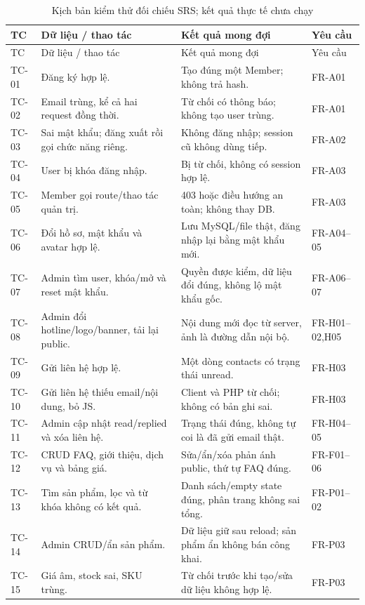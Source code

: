 {\small
\begin{longtable}{@{}P{1.3cm}P{4.7cm}P{6.1cm}P{2.4cm}@{}}
\caption{Kịch bản kiểm thử đối chiếu SRS; kết quả thực tế chưa chạy}\label{tab:test-cases}\\
\toprule TC & Dữ liệu / thao tác & Kết quả mong đợi & Yêu cầu\\\midrule\endfirsthead
\toprule TC & Dữ liệu / thao tác & Kết quả mong đợi & Yêu cầu\\\midrule\endhead
TC-01 & Đăng ký hợp lệ. & Tạo đúng một Member; không trả hash. & FR-A01\\
TC-02 & Email trùng, kể cả hai request đồng thời. & Từ chối có thông báo; không tạo user trùng. & FR-A01\\
TC-03 & Sai mật khẩu; đăng xuất rồi gọi chức năng riêng. & Không đăng nhập; session cũ không dùng tiếp. & FR-A02\\
TC-04 & User bị khóa đăng nhập. & Bị từ chối, không có session hợp lệ. & FR-A03\\
TC-05 & Member gọi route/thao tác quản trị. & 403 hoặc điều hướng an toàn; không thay DB. & FR-A03\\
TC-06 & Đổi hồ sơ, mật khẩu và avatar hợp lệ. & Lưu MySQL/file thật, đăng nhập lại bằng mật khẩu mới. & FR-A04–05\\
TC-07 & Admin tìm user, khóa/mở và reset mật khẩu. & Quyền được kiểm, dữ liệu đổi đúng, không lộ mật khẩu gốc. & FR-A06–07\\
TC-08 & Admin đổi hotline/logo/banner, tải lại public. & Nội dung mới đọc từ server, ảnh là đường dẫn nội bộ. & FR-H01–02,H05\\
TC-09 & Gửi liên hệ hợp lệ. & Một dòng contacts có trạng thái unread. & FR-H03\\
TC-10 & Gửi liên hệ thiếu email/nội dung, bỏ JS. & Client và PHP từ chối; không có bản ghi sai. & FR-H03\\
TC-11 & Admin cập nhật read/replied và xóa liên hệ. & Trạng thái đúng, không tự coi là đã gửi email thật. & FR-H04–05\\
TC-12 & CRUD FAQ, giới thiệu, dịch vụ và bảng giá. & Sửa/ẩn/xóa phản ánh public, thứ tự FAQ đúng. & FR-F01–06\\
TC-13 & Tìm sản phẩm, lọc và từ khóa không có kết quả. & Danh sách/empty state đúng, phân trang không sai tổng. & FR-P01–02\\
TC-14 & Admin CRUD/ẩn sản phẩm. & Dữ liệu giữ sau reload; sản phẩm ẩn không bán công khai. & FR-P03\\
TC-15 & Giá âm, stock sai, SKU trùng. & Từ chối trước khi tạo/sửa dữ liệu không hợp lệ. & FR-P03\\

\end{longtable}}
